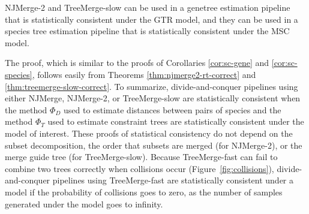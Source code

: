 \begin{corollary}
\label{sc:treemerge-slow-sc}
NJMerge-2 and TreeMerge-slow can be used in a \gls{genetree} estimation pipeline that is statistically consistent under the \gls{GTR} model, and they can be used in a species tree estimation pipeline that is statistically consistent under the \gls{MSC} model.
\end{corollary}

The proof, which is similar to the proofs of Corollaries \ref{cor:sc-gene} and \ref{cor:sc-species}, follows easily from Theorems \ref{thm:njmerge2-rt-correct} and \ref{thm:treemerge-slow-correct}. 
To summarize, divide-and-conquer pipelines using either NJMerge, NJMerge-2, or TreeMerge-slow are statistically consistent when the method $\Phi_D$ used to estimate distances between pairs of species and the method $\Phi_T$ used to estimate constraint trees are statistically consistent under the model of interest.
These proofs of statistical consistency do not depend on the subset decomposition, the order that subsets are merged (for NJMerge-2), or the merge guide tree (for TreeMerge-slow).
Because TreeMerge-fast can fail to combine two trees correctly when collisions occur (Figure~\ref{fig:collisions}), divide-and-conquer pipelines using TreeMerge-fast are statistically consistent under a model if the probability of collisions goes to zero, as the number of samples generated under the model goes to infinity.


